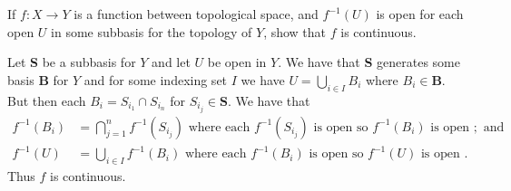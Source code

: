 \documentclass[letterpaper, 11pt, oneside]{book}
\begin{document}
\begin{exercise}
  If $f\colon X \to Y$ is a function between topological space, and $f^{-1}(U)$ is open for each open $U$ in some subbasis for the topology of $Y$, show that $f$ is continuous.
\end{exercise}
\begin{pf}
  Let \textbf{S} be a subbasis for $Y$ and let $U$ be open in $Y$.
  We have that \textbf{S} generates some basis \textbf{B} for $Y$ and for some indexing set $I$ we have $U = \bigcup_{i \in I} B_{i}$ where $B_{i} \in \textbf{B}$.
  But then each $B_{i} = S_{i_{1}} \cap S_{i_{n}}$ for $S_{i_{j}} \in \textbf{S}$.
  We have that
  \begin{align*}
    f^{-1}(B_{i}) &= \bigcap_{j = 1}^{n} f^{-1}(S_{i_{j}}) \text{ where each } f^{-1}(S_{i_{j}}) \text{ is open so } f^{-1}(B_{i}) \text{ is open }; \text{ and} \\
    f^{-1}(U) &= \bigcup_{i \in I} f^{-1}(B_{i}) \text{ where each } f^{-1}(B_{i}) \text{ is open so } f^{-1}(U) \text{ is open }.
  \end{align*}
  Thus $f$ is continuous.
\end{pf}

\clearpage
\end{document}
